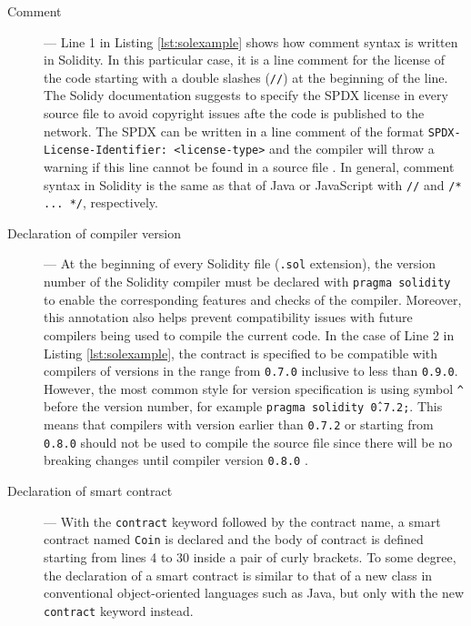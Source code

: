 \begin{description}
\item[Comment] --- Line 1 in Listing \ref{lst:solexample} shows how comment syntax is written in Solidity. In this particular case, it is a line comment for the license of the code starting with a double slashes (\texttt{//}) at the beginning of the line. The Solidy documentation suggests to specify the SPDX license in every source file to avoid copyright issues afte the code is published to the network. The SPDX can be written in a line comment of the format \texttt{SPDX-License-Identifier: <license-type>} and the compiler will throw a warning if this line cannot be found in a source file \cite{soldocs_sollayout}. In general, comment syntax in Solidity is the same as that of Java or JavaScript with \texttt{//} and \texttt{/* ... */}, respectively. 

\item[Declaration of compiler version] --- At the beginning of every Solidity file (\texttt{.sol} extension), the version number of the Solidity compiler must be declared with \texttt{pragma solidity} to enable the corresponding features and checks of the compiler. Moreover, this annotation also helps prevent compatibility issues with future compilers being used to compile the current code. In the case of Line 2 in Listing \ref{lst:solexample}, the contract is specified to be compatible with compilers of versions in the range from \texttt{0.7.0} inclusive to less than \texttt{0.9.0}. However, the most common style for version specification is using symbol \texttt{\^} before the version number, for example \texttt{pragma solidity \^0.7.2;}. This means that compilers with version earlier than \texttt{0.7.2} or starting from \texttt{0.8.0} should not be used to compile the source file since there will be no breaking changes until compiler version \texttt{0.8.0} \cite{soldocs_sollayout}.

\item[Declaration of smart contract] --- With the \texttt{contract} keyword followed by the contract name, a smart contract named \texttt{Coin} is declared and the body of contract is defined starting from lines 4 to 30 inside a pair of curly brackets. To some degree, the declaration of a smart contract is similar to that of a new class in conventional object-oriented languages such as Java, but only with the new \texttt{contract} keyword instead.



\end{description}
